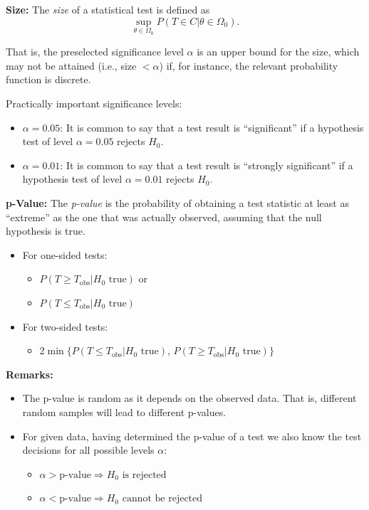 \documentclass[]{book}
\providecommand{\tightlist}{%
  \setlength{\itemsep}{0pt}\setlength{\parskip}{0pt}}
\theoremstyle{definition}
\theoremstyle{definition}
\theoremstyle{definition}
\theoremstyle{remark}
\begin{document}
\textbf{Size:}
The \emph{size} of a statistical test is defined as
\[\sup_{\theta\in\Omega_0} P(T\in C|\theta\in\Omega_0).\]

That is, the preselected significance level \(\alpha\) is an upper bound for the size, which may not be attained (i.e., size \(<\alpha\)) if, for instance, the relevant probability function is discrete.

Practically important significance levels:

\begin{itemize}
\tightlist
\item
  \(\alpha=0.05\): It is common to say that a test result is ``significant'' if a hypothesis test of level \(\alpha=0.05\) rejects \(H_0\).
\item
  \(\alpha=0.01\): It is common to say that a test result is ``strongly significant'' if a hypothesis test of level \(\alpha=0.01\) rejects \(H_0\).
\end{itemize}

\textbf{p-Value:} The \emph{p-value} is the probability of obtaining a test statistic at least as ``extreme'' as the one that was actually observed, assuming that the null hypothesis is true.

\begin{itemize}
\tightlist
\item
  For one-sided tests:

  \begin{itemize}
  \tightlist
  \item
    \(P(T\geq T_{\text{obs}}|H_0\text{ true})\) or
  \item
    \(P(T\leq T_{\text{obs}}|H_0\text{ true})\)
  \end{itemize}
\item
  For two-sided tests:

  \begin{itemize}
  \tightlist
  \item
    \(2\min\{P(T\leq T_{\text{obs}}|H_0\text{ true}),\,P(T\geq T_{\text{obs}}|H_0\text{ true})\}\)
  \end{itemize}
\end{itemize}

\textbf{Remarks:}

\begin{itemize}
\item
  The p-value is random as it depends on the observed data. That is, different random samples will lead to different p-values.
\item
  For given data, having determined the p-value of a test we also know the test decisions for all possible levels \(\alpha\):

  \begin{itemize}
  \tightlist
  \item
    \(\alpha > \text{p-value} \Rightarrow H_0 \text{ is rejected}\)
  \item
    \(\alpha < \text{p-value} \Rightarrow H_0 \text{ cannot be rejected}\)
  \end{itemize}
\end{itemize}
\end{document}
